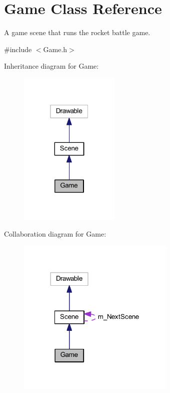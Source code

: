 \hypertarget{class_game}{}\section{Game Class Reference}
\label{class_game}


A game scene that runs the rocket battle game.  




{\ttfamily \#include $<$Game.\+h$>$}



Inheritance diagram for Game\+:\nopagebreak
\begin{figure}[H]
\begin{center}
\leavevmode
\includegraphics[width=136pt]{class_game__inherit__graph}
\end{center}
\end{figure}


Collaboration diagram for Game\+:\nopagebreak
\begin{figure}[H]
\begin{center}
\leavevmode
\includegraphics[width=213pt]{class_game__coll__graph}
\end{center}
\end{figure}
